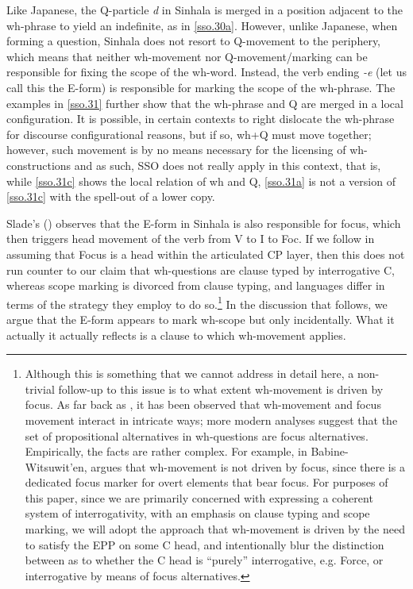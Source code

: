 \documentclass[charis]{glossa}
\begin{document}
Like Japanese, the Q-particle \textit{d\textschwa} in Sinhala is merged in a position adjacent to the wh-phrase to yield an indefinite, as in \ref{sso.30a}. However, unlike Japanese, when forming a question, Sinhala does not resort to Q-movement to the periphery, which means that neither wh-movement nor Q-movement/marking can be responsible for fixing the scope of the wh-word. Instead, the verb ending \textit{-e} (let us call this the E-form) is responsible for marking the scope of the wh-phrase. The examples in \ref{sso.31} further show that the wh-phrase and Q are merged in a local configuration. It is possible, in certain contexts to right dislocate the wh-phrase for discourse configurational reasons, but if so, wh+Q must move together; however, such movement is by no means necessary for the licensing of wh-constructions and as such, SSO does not really apply in this context, that is, while \ref{sso.31c} shows the local relation of wh and Q, \ref{sso.31a} is not a version of \ref{sso.31c} with the spell-out of a lower copy.

Slade's (\citeyear{slade:2011}) observes that the E-form in Sinhala is also responsible for focus, which then triggers head movement of the verb from V to I to Foc. If we follow \cite{rizzi:1997} in assuming that Focus is a head within the articulated CP layer, then this does not run counter to our claim that wh-questions are clause typed by interrogative C, whereas scope marking is divorced from clause typing, and languages differ in terms of the strategy they employ to do so.\footnote{Although this is something that we cannot address in detail here, a non-trivial follow-up to this issue is to what extent wh-movement is driven by focus. As far back as \cite{huang:1982}, it has been observed that wh-movement and focus movement interact in intricate ways; more modern analyses \citep{beck:2006} suggest that the set of propositional alternatives in wh-questions are focus alternatives. Empirically, the facts are rather complex. For example, in Babine-Witsuwit'en, \cite{denham:2000} argues that wh-movement is not driven by focus, since there is a dedicated focus marker for overt elements that bear focus. For purposes of this paper, since we are primarily concerned with expressing a coherent system of interrogativity, with an emphasis on clause typing and scope marking, we will adopt the approach that wh-movement is driven by the need to satisfy the EPP on some C head, and intentionally blur the distinction between as to whether the C head is ``purely'' interrogative, e.g. Force, or interrogative by means of focus alternatives.} In the discussion that follows, we argue that the E-form appears to mark wh-scope but only incidentally. What it actually it actually reflects is a clause to which wh-movement applies.
\end{document}
